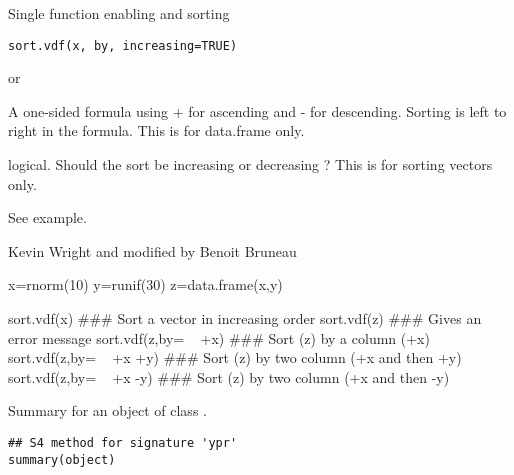 \documentclass[a4paper]{book}
\begin{document}
\newpage
{}
%
\begin{Description}\relax
Single function enabling  and  sorting
\end{Description}
%
\begin{Usage}
\begin{verbatim}
sort.vdf(x, by, increasing=TRUE)
\end{verbatim}
\end{Usage}
%
\begin{Arguments}
\begin{ldescription}
\item[\code{x}]  or 
\item[\code{by}] A one-sided formula using + for ascending and - for descending. Sorting is left to right in the formula. This is for data.frame only.
\item[\code{increasing}] logical. Should the sort be increasing  or decreasing ? This is for sorting vectors only.

\end{ldescription}
\end{Arguments}
%
\begin{Details}\relax
See example.
\end{Details}
%
\begin{Author}\relax
Kevin Wright and modified by Benoit Bruneau
\end{Author}
%
\begin{Examples}
\begin{ExampleCode}
x=rnorm(10)
y=runif(30)
z=data.frame(x,y)

sort.vdf(x)                 ### Sort a vector in increasing order
sort.vdf(z)                 ### Gives an error message
sort.vdf(z,by= ~ +x)        ### Sort (z) by a column (+x)
sort.vdf(z,by= ~ +x +y)     ### Sort (z) by two column (+x and then +y)
sort.vdf(z,by= ~ +x -y)     ### Sort (z) by two column (+x and then -y)
\end{ExampleCode}
\end{Examples}
\newpage
{}
%
\begin{Description}\relax
Summary for an object of class .
\end{Description}
%
\begin{Usage}
\begin{verbatim}
## S4 method for signature 'ypr'
summary(object)
\end{verbatim}
\end{Usage}
\end{document}
